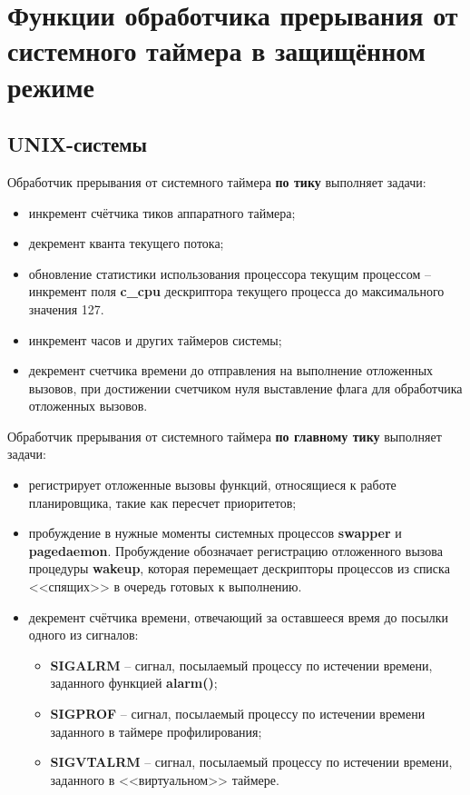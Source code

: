 \chapter{Функции обработчика прерывания от системного таймера в защищённом режиме}

\section{UNIX-системы}

Обработчик прерывания от системного таймера \textbf{по тику} выполняет задачи:

\begin{itemize}
    \item инкремент счётчика тиков аппаратного таймера;
    \item декремент кванта текущего потока;
    \item обновление статистики использования процессора текущим процессом -- инкремент поля \textbf{c\_cpu} дескриптора текущего процесса до максимального значения 127.
    \item инкремент часов и других таймеров системы;
    \item декремент счетчика времени до отправления на выполнение отложенных вызовов, при достижении счетчиком нуля выставление флага для обработчика отложенных вызовов.
\end{itemize}

Обработчик прерывания от системного таймера \textbf{по главному тику} выполняет задачи:

\begin{itemize}
    \item регистрирует отложенные вызовы функций, относящиеся к работе планировщика, такие как пересчет приоритетов;
    \item пробуждение в нужные моменты системных процессов \textbf{swapper} и \textbf{pagedaemon}. Пробуждение обозначает регистрацию отложенного вызова процедуры \textbf{wakeup}, которая перемещает дескрипторы процессов из списка <<спящих>> в очередь готовых к выполнению.
    \item декремент счётчика времени, отвечающий за оставшееся время до посылки одного из сигналов:
        \begin{itemize}
            \item \textbf{SIGALRM} -- сигнал, посылаемый процессу по истечении времени, заданного функцией \textbf{alarm()};
            \item \textbf{SIGPROF} -- сигнал, посылаемый процессу по истечении времени заданного в таймере профилирования;
            \item \textbf{SIGVTALRM} --  сигнал, посылаемый процессу по истечении времени, заданного в <<виртуальном>> таймере.
        \end{itemize}
\end{itemize}

